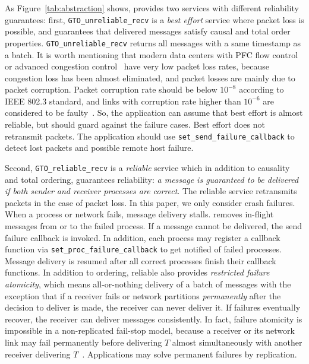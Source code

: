 As Figure~\ref{tab:abstraction} shows, \sys{} provides two services with different reliability guarantees: first, \texttt{GTO\_unreliable\_recv} is a \emph{best effort} service where packet loss is possible, and \sys{} guarantees that delivered messages satisfy causal and total order properties. \texttt{GTO\_unreliable\_recv} returns all messages with a same timestamp as a batch.
It is worth mentioning that modern data centers with PFC flow control~\cite{pfc} or advanced congestion control~\cite{kumar2020swift,hu2020aeolus,perry2015fastpass,gao2015phost} have very low packet loss rates, because congestion loss has been almost eliminated, and packet losses are mainly due to packet corruption. Packet corruption rate should be below $10^{-8}$ according to IEEE 802.3 standard, and links with corruption rate higher than $10^{-6}$ are considered to be faulty~\cite{zhuo2017understanding}.
So, the application can assume that best effort \sys{} is almost reliable, but should guard against the failure cases.
Best effort \sys{} does not retransmit packets.
The application should use \texttt{set\_send\_failure\_callback} to detect lost packets and possible remote host failure.

Second, \texttt{GTO\_reliable\_recv} is a \emph{reliable} service which in addition to causality and total ordering, guarantees reliability: \emph{a message is guaranteed to be delivered if both sender and receiver processes are correct}.
The reliable service retransmits packets in the case of packet loss.
In this paper, we only consider crash failures.
When a process or network fails, message delivery stalls.
\sys{} removes in-flight messages from or to the failed process.
If a message cannot be delivered, the send failure callback is invoked.
In addition, each process may register a callback function via \texttt{set\_proc\_failure\_callback} to get notified of failed processes.
Message delivery is resumed after all correct processes finish their callback functions.
In addition to ordering, reliable \sys{} also provides \emph{restricted failure atomicity}, which means all-or-nothing delivery of a batch of messages with the exception that if a receiver fails or network partitions \emph{permanently} after the decision to deliver is made, the receiver can never deliver it.
If failures eventually recover, the receiver can deliver messages consistently.
In fact, failure atomicity is impossible in a non-replicated fail-stop model, because a receiver or its network link may fail permanently before delivering $T$ almost simultaneously with another receiver delivering $T$~\cite{fischer1985impossibility}.
Applications may solve permanent failures by replication.

